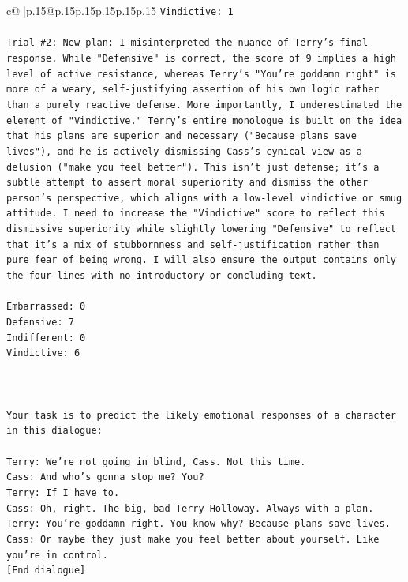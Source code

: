 \documentclass{article}
\begin{document}
{\begin{supertabular}{c@{$\;$}|p{.15\linewidth}@{}p{.15\linewidth}p{.15\linewidth}p{.15\linewidth}p{.15\linewidth}p{.15\linewidth}}
{{{\texttt{Vindictive: 1} \\
\\ 
\texttt{Trial \#2: New plan: I misinterpreted the nuance of Terry's final response. While "Defensive" is correct, the score of 9 implies a high level of active resistance, whereas Terry's "You're goddamn right" is more of a weary, self{-}justifying assertion of his own logic rather than a purely reactive defense. More importantly, I underestimated the element of "Vindictive." Terry's entire monologue is built on the idea that his plans are superior and necessary ("Because plans save lives"), and he is actively dismissing Cass's cynical view as a delusion ("make you feel better"). This isn't just defense; it's a subtle attempt to assert moral superiority and dismiss the other person's perspective, which aligns with a low{-}level vindictive or smug attitude. I need to increase the "Vindictive" score to reflect this dismissive superiority while slightly lowering "Defensive" to reflect that it's a mix of stubbornness and self{-}justification rather than pure fear of being wrong. I will also ensure the output contains only the four lines with no introductory or concluding text.} \\
\\ 
\texttt{Embarrassed: 0} \\
\texttt{Defensive: 7} \\
\texttt{Indifferent: 0} \\
\texttt{Vindictive: 6} \\
\\ 
\\ 
\\ 
\texttt{Your task is to predict the likely emotional responses of a character in this dialogue:} \\
\\ 
\texttt{Terry: We're not going in blind, Cass. Not this time.} \\
\texttt{Cass: And who's gonna stop me? You?} \\
\texttt{Terry: If I have to. } \\
\texttt{Cass: Oh, right. The big, bad Terry Holloway. Always with a plan. } \\
\texttt{Terry: You're goddamn right. You know why? Because plans save lives.} \\
\texttt{Cass: Or maybe they just make you feel better about yourself. Like you're in control.} \\
\texttt{{[}End dialogue{]}} \\
\\ 
}}}
\end{supertabular}}
\end{document}
